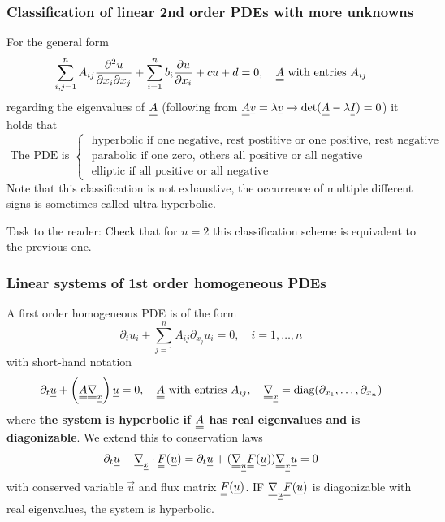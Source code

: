 \subsubsection{Classification of linear 2nd order PDEs with more unknowns}
For the general form
\begin{equation}
    \sum_{i, j=1}^n A_{i j} \frac{\partial^2 u}{\partial x_i \partial x_j}+\sum_{i=1}^n b_i \frac{\partial u}{\partial x_i}+c u+d=0, \quad \mat{A} \text { with entries } A_{i j}
\end{equation}
regarding the eigenvalues of $\mat{A}$ (following from $\mat{A}\vec{v} = \lambda \vec{v} \rightarrow \det(\mat{A}-\lambda \mat{I}) = 0$) it holds that
\begin{equation}
    \text { The PDE is }\left\{\begin{array}{c}
    \text { hyperbolic if one negative, rest postitive or one positive, rest negative } \\
    \text { parabolic if one zero, others all positive or all negative } \\
    \text { elliptic if all positive or all negative }
    \end{array}\right.
\end{equation}
Note that this classification is not exhaustive, the occurrence of multiple different signs is sometimes called ultra-hyperbolic.

Task to the reader: Check that for $n=2$ this classification scheme is equivalent to the previous one.

\subsubsection{Linear systems of 1st order homogeneous PDEs}
A first order homogeneous PDE is of the form
\begin{equation}
    \partial_t u_i + \sum_{j=1}^n A_{i j} \partial_{x_j} u_i = 0, \quad i = 1, \dots, n
\end{equation}
with short-hand notation
\begin{equation}
    \partial_t \vec{u} + \left(\mat{A} \mat{\nabla}_\vec{x} \right) \vec{u} = 0, \quad \mat{A} \text { with entries } A_{i j}, \quad \mat{\nabla}_\vec{x} = \text{diag}(\partial_{x_1}, \dots, \partial_{x_n})
\end{equation}
where \textbf{the system is hyperbolic if $\mat{A}$ has real eigenvalues and is diagonizable}.
We extend this to conservation laws
\begin{equation}
    \partial_t \vec{u} + \vec{\nabla}_\vec{x} \cdot \mat{F}(\vec{u}) = \partial_t \vec{u} + (\mat{\nabla}_\vec{u} \mat{F}(\vec{u})) \mat{\nabla}_\vec{x} \vec{u} = 0
\end{equation}
with conserved variable $\vec{u}$ and flux matrix $\mat{F}(\vec{u})$. IF $\mat{\nabla}_\vec{u} \mat{F}(\vec{u})$ is diagonizable with real eigenvalues, the system is hyperbolic.

